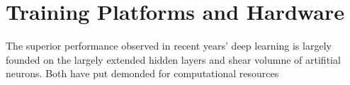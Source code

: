 \section{Training Platforms and Hardware}
The superior performance observed in recent years' deep learning is largely founded on the largely extended hidden layers and shear volumne of artifitial neurons. Both have put demonded for computational resources 